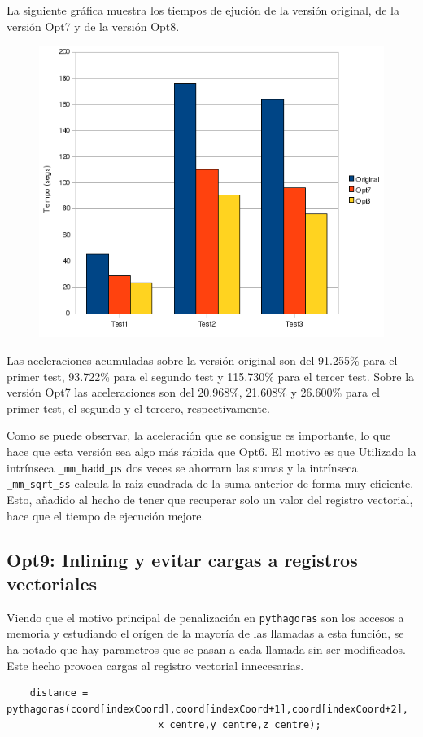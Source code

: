 La siguiente gr\'{a}fica muestra los tiempos de ejuci\'{o}n de la versi\'{o}n
original, de la versi\'{o}n Opt7 y de la versi\'{o}n Opt8.

\begin{figure}[ht]
   \centering
   \includegraphics[keepaspectratio=true,width=.5\textwidth]{figures/opt8-perf}
\end{figure}

Las aceleraciones acumuladas sobre la versi\'{o}n original son del 91.255\%
para el primer test, 93.722\% para el segundo test y 115.730\% para el tercer
test. Sobre la versi\'{o}n Opt7 las aceleraciones son del 20.968\%, 21.608\% y
26.600\% para el primer test, el segundo y el tercero, respectivamente.

Como se puede observar, la aceleraci\'{o}n que se consigue es importante, lo que
hace que esta versi\'{o}n sea algo m\'{a}s r\'{a}pida que Opt6. El motivo es que
Utilizado la intr\'{i}nseca \texttt{\_mm\_hadd\_ps} dos veces se ahorrarn las
sumas y la intr\'{i}nseca \texttt{\_mm\_sqrt\_ss} calcula la raiz cuadrada de la
suma anterior de forma muy eficiente. Esto, a\~{n}adido al hecho de tener que
recuperar solo un valor del registro vectorial, hace que el tiempo de
ejecuci\'{o}n mejore.

\subsection{Opt9: Inlining y evitar cargas a registros vectoriales}

Viendo que el motivo principal de penalizaci\'{o}n en \texttt{pythagoras} son
los accesos a memoria y estudiando el or\'{i}gen de la mayor\'{i}a de las
llamadas a esta funci\'{o}n, se ha notado que hay parametros que se pasan a cada
llamada sin ser modificados. Este hecho provoca cargas al registro vectorial
innecesarias.

\begin{lstlisting}
    distance = pythagoras(coord[indexCoord],coord[indexCoord+1],coord[indexCoord+2],
                          x_centre,y_centre,z_centre);
\end{lstlisting}
 
